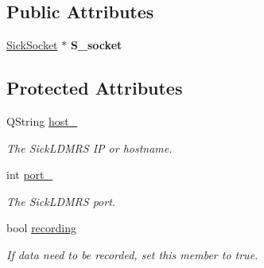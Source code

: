 \subsection*{Public Attributes}
\begin{DoxyCompactItemize}
\item 
\hypertarget{classpacpus_1_1AbstractSickSensor_af030c5aadd2868dc741b25ba1dc07f9f}{\hyperlink{classpacpus_1_1SickSocket}{Sick\-Socket} $\ast$ {\bfseries S\-\_\-socket}}\label{classpacpus_1_1AbstractSickSensor_af030c5aadd2868dc741b25ba1dc07f9f}

\end{DoxyCompactItemize}
\subsection*{Protected Attributes}
\begin{DoxyCompactItemize}
\item 
\hypertarget{classpacpus_1_1AbstractSickSensor_ab617c6d1973124fa26053c7b928920aa}{Q\-String \hyperlink{classpacpus_1_1AbstractSickSensor_ab617c6d1973124fa26053c7b928920aa}{host\-\_\-}}\label{classpacpus_1_1AbstractSickSensor_ab617c6d1973124fa26053c7b928920aa}

\begin{DoxyCompactList}\small\item\em The Sick\-L\-D\-M\-R\-S I\-P or hostname. \end{DoxyCompactList}\item 
\hypertarget{classpacpus_1_1AbstractSickSensor_a58a4923a77b6be4d5847837e57be3b76}{int \hyperlink{classpacpus_1_1AbstractSickSensor_a58a4923a77b6be4d5847837e57be3b76}{port\-\_\-}}\label{classpacpus_1_1AbstractSickSensor_a58a4923a77b6be4d5847837e57be3b76}

\begin{DoxyCompactList}\small\item\em The Sick\-L\-D\-M\-R\-S port. \end{DoxyCompactList}\item 
\hypertarget{classpacpus_1_1AbstractSickSensor_a2cefb63d92089cab86f874a3390acb28}{bool \hyperlink{classpacpus_1_1AbstractSickSensor_a2cefb63d92089cab86f874a3390acb28}{recording}}\label{classpacpus_1_1AbstractSickSensor_a2cefb63d92089cab86f874a3390acb28}

\begin{DoxyCompactList}\small\item\em If data need to be recorded, set this member to true. \end{DoxyCompactList}\end{DoxyCompactItemize}


